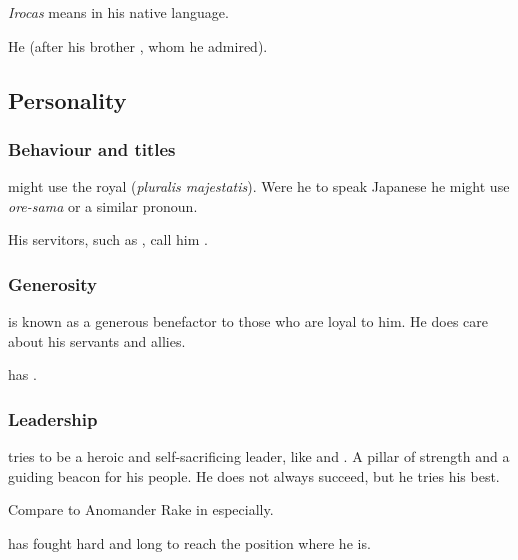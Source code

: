 \emph{Irocas} means  in his native \Saphyr language. 

He  (after his brother , whom he admired). 








\subsection{Personality}





\subsubsection{Behaviour and titles}
\Secherdamon{} might use the royal  (\emph{pluralis majestatis}). 
Were he to speak Japanese he might use \emph{ore-sama} or a similar pronoun.

His servitors, such as \LocarPsyrex, call him . 





\subsubsection{Generosity}
\Secherdamon{} is known as a generous benefactor to those who are loyal to him. 
He does care about his servants and allies. 

\Ishnaruchaefir{} has . 





\subsubsection{Leadership}
\Secherdamon{} tries to be a heroic and self-sacrificing leader, like \TyarithXserasshana{} and \Nexagglachel. 
A pillar of strength and a guiding beacon for his people. 
He does not always succeed, but he tries his best. 

Compare to Anomander Rake in \cite{StevenErikson:TolltheHounds} especially. 

\Secherdamon{} has fought hard and long to reach the position where he is. 

